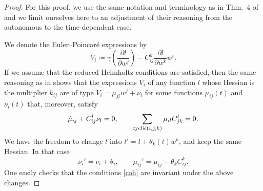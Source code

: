 \documentclass[11pt]{article}
\theoremstyle{plain}
\theoremstyle{definition}
\begin{document}
\begin{proof} For this proof, we use the same notation and terminology as in Thm.~4 of \cite{crampin2008invariantinv} and we limit ourselves here to an adjustment of their reasoning from the autonomous to the time-dependent case.

We denote the Euler--Poincar\'e expressions by
\begin{equation*}
    V_i\coloneqq \gamma\left(\frac{\partial l}{\partial w^j}\right)-C_{ij}^k \frac{\partial l}{\partial w^k}w^i.
\end{equation*}
 If we assume that the reduced Helmholtz conditions are satisfied, then the same reasoning as in \cite{crampin2008invariantinv} shows that the expressions $V_i$ of any function $l$ whose Hessian is the multiplier $k_{ij}$ are of type $V_i=\mu_{ji}w^j+\nu_i$ for some functions $\mu_{ij}(t)$ and $\nu_i(t)$ that, moreover, satisfy
\begin{equation} \label{coh}
    {\dot\mu}_{ij} + C^l_{ij}\nu_l = 0,\qquad  \sum_{{\rm{cyclic}}(i,j,k)} \mu_{il}C^l_{jk} = 0.
\end{equation}
We have the freedom to change $l$ into $l'=l+\theta_k(t) w^k$, and keep the same Hessian. In that case
\begin{equation*}
    \nu_i'=\nu_i +{\dot\theta}_i, \qquad \mu_{ij}'=\mu_{ij}-\theta_k C^k_{ij}.
\end{equation*}
One easily checks that the conditions \eqref{coh} are invariant under the above changes. 



\end{proof}
\end{document}
